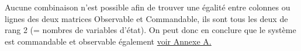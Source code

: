 \par Aucune combinaison n'est possible afin de trouver une égalité entre colonnes ou lignes des deux matrices Observable et Commandable, ils sont tous les deux de rang 2 (= nombres de variables d'état). On peut donc en conclure que le système est commandable et observable également \label{section 1.2} \hyperref[Annexe A]{voir Annexe A.}\\



